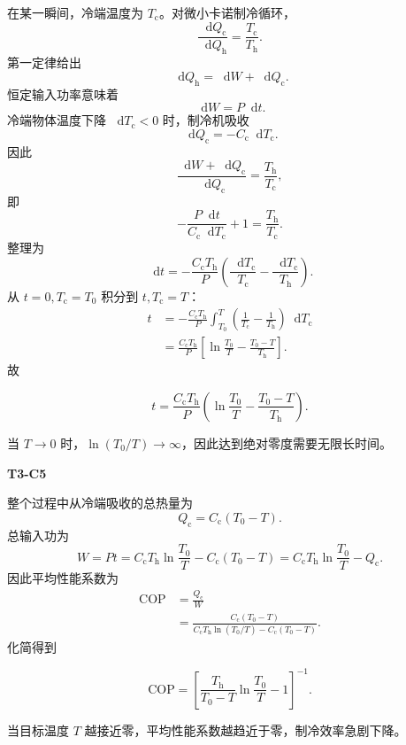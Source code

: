 \documentclass[UTF8,11pt,a4paper,fontset=fandol]{ctexart}
\newcommand{\dd}{\mathop{}\!\mathrm d}
\begin{document}
\begin{solutionbox}
在某一瞬间，冷端温度为 $T_{\mathrm c}$。对微小卡诺制冷循环，
\[
\frac{\dd Q_{\mathrm c}}{\dd Q_{\mathrm h}}=\frac{T_{\mathrm c}}{T_{\mathrm h}}.
\]
第一定律给出
\[
\dd Q_{\mathrm h}=\dd W+\dd Q_{\mathrm c}.
\]
恒定输入功率意味着
\[
\dd W=P\dd t.
\]
冷端物体温度下降 $\dd T_{\mathrm c}<0$ 时，制冷机吸收
\[
\dd Q_{\mathrm c}=-C_{\mathrm c}\dd T_{\mathrm c}.
\]
因此
\[
\frac{\dd W+\dd Q_{\mathrm c}}{\dd Q_{\mathrm c}}
=\frac{T_{\mathrm h}}{T_{\mathrm c}},
\]
即
\[
-\frac{P\dd t}{C_{\mathrm c}\dd T_{\mathrm c}}+1
=\frac{T_{\mathrm h}}{T_{\mathrm c}}.
\]
整理为
\[
\dd t=-\frac{C_{\mathrm c}T_{\mathrm h}}{P}
\left(\frac{\dd T_{\mathrm c}}{T_{\mathrm c}}
-\frac{\dd T_{\mathrm c}}{T_{\mathrm h}}\right).
\]
从 $t=0,T_{\mathrm c}=T_0$ 积分到 $t,T_{\mathrm c}=T$：
\begin{align*}
t
&=-\frac{C_{\mathrm c}T_{\mathrm h}}{P}
\int_{T_0}^{T}\left(\frac1{T_{\mathrm c}}-\frac1{T_{\mathrm h}}\right)\dd T_{\mathrm c}\\
&=\frac{C_{\mathrm c}T_{\mathrm h}}{P}
\left[\ln\frac{T_0}{T}-\frac{T_0-T}{T_{\mathrm h}}\right].
\end{align*}
故
\begin{answerbox}
\[
\boxed{t=\frac{C_{\mathrm c}T_{\mathrm h}}{P}
\left(\ln\dfrac{T_0}{T}-\dfrac{T_0-T}{T_{\mathrm h}}\right)}.
\]
\end{answerbox}
当 $T\to0$ 时，$\ln(T_0/T)\to\infty$，因此达到绝对零度需要无限长时间。

\textbf{T3-C5}

整个过程中从冷端吸收的总热量为
\[
Q_{\mathrm c}=C_{\mathrm c}(T_0-T).
\]
总输入功为
\[
W=Pt
=C_{\mathrm c}T_{\mathrm h}\ln\frac{T_0}{T}
-C_{\mathrm c}(T_0-T)
=C_{\mathrm c}T_{\mathrm h}\ln\frac{T_0}{T}-Q_{\mathrm c}.
\]
因此平均性能系数为
\begin{align*}
\mathrm{COP}
&=\frac{Q_{\mathrm c}}{W}\\
&=\frac{C_{\mathrm c}(T_0-T)}{C_{\mathrm c}T_{\mathrm h}\ln(T_0/T)-C_{\mathrm c}(T_0-T)}.
\end{align*}
化简得到
\begin{answerbox}
\[
\boxed{\mathrm{COP}
=\left[\frac{T_{\mathrm h}}{T_0-T}\ln\frac{T_0}{T}-1\right]^{-1}}.
\]
\end{answerbox}
当目标温度 $T$ 越接近零，平均性能系数越趋近于零，制冷效率急剧下降。
\end{solutionbox}
\end{document}
